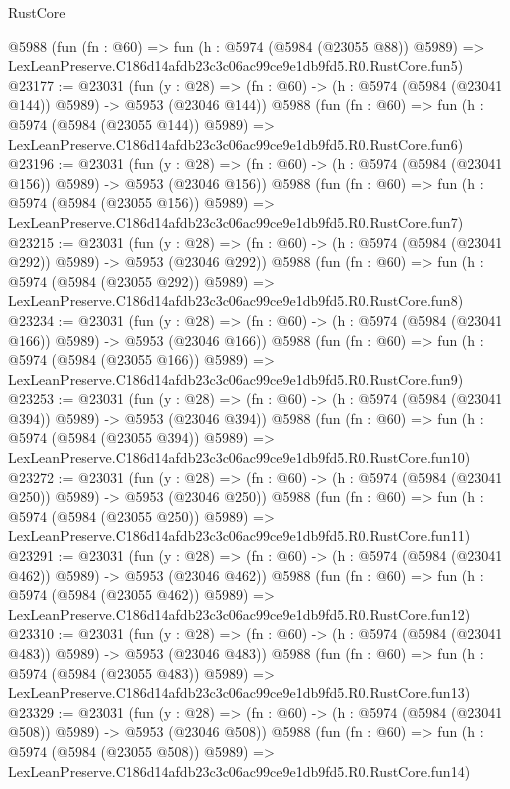 \begin{lexlean}{RustCore}
\begin{coremodule}
    @5988
    (fun (fn : @60) =>
    fun (h : @5974 (@5984 (@23055 @88)) @5989) =>
    LexLeanPreserve.C186d14afdb23c3c06ac99ce9e1db9fd5.R0.RustCore.fun5)
@23177 := @23031
    (fun (y : @28) => (fn : @60) -> (h : @5974 (@5984 (@23041 @144)) @5989) -> @5953 (@23046 @144))
    @5988
    (fun (fn : @60) =>
    fun (h : @5974 (@5984 (@23055 @144)) @5989) =>
    LexLeanPreserve.C186d14afdb23c3c06ac99ce9e1db9fd5.R0.RustCore.fun6)
@23196 := @23031
    (fun (y : @28) => (fn : @60) -> (h : @5974 (@5984 (@23041 @156)) @5989) -> @5953 (@23046 @156))
    @5988
    (fun (fn : @60) =>
    fun (h : @5974 (@5984 (@23055 @156)) @5989) =>
    LexLeanPreserve.C186d14afdb23c3c06ac99ce9e1db9fd5.R0.RustCore.fun7)
@23215 := @23031
    (fun (y : @28) => (fn : @60) -> (h : @5974 (@5984 (@23041 @292)) @5989) -> @5953 (@23046 @292))
    @5988
    (fun (fn : @60) =>
    fun (h : @5974 (@5984 (@23055 @292)) @5989) =>
    LexLeanPreserve.C186d14afdb23c3c06ac99ce9e1db9fd5.R0.RustCore.fun8)
@23234 := @23031
    (fun (y : @28) => (fn : @60) -> (h : @5974 (@5984 (@23041 @166)) @5989) -> @5953 (@23046 @166))
    @5988
    (fun (fn : @60) =>
    fun (h : @5974 (@5984 (@23055 @166)) @5989) =>
    LexLeanPreserve.C186d14afdb23c3c06ac99ce9e1db9fd5.R0.RustCore.fun9)
@23253 := @23031
    (fun (y : @28) => (fn : @60) -> (h : @5974 (@5984 (@23041 @394)) @5989) -> @5953 (@23046 @394))
    @5988
    (fun (fn : @60) =>
    fun (h : @5974 (@5984 (@23055 @394)) @5989) =>
    LexLeanPreserve.C186d14afdb23c3c06ac99ce9e1db9fd5.R0.RustCore.fun10)
@23272 := @23031
    (fun (y : @28) => (fn : @60) -> (h : @5974 (@5984 (@23041 @250)) @5989) -> @5953 (@23046 @250))
    @5988
    (fun (fn : @60) =>
    fun (h : @5974 (@5984 (@23055 @250)) @5989) =>
    LexLeanPreserve.C186d14afdb23c3c06ac99ce9e1db9fd5.R0.RustCore.fun11)
@23291 := @23031
    (fun (y : @28) => (fn : @60) -> (h : @5974 (@5984 (@23041 @462)) @5989) -> @5953 (@23046 @462))
    @5988
    (fun (fn : @60) =>
    fun (h : @5974 (@5984 (@23055 @462)) @5989) =>
    LexLeanPreserve.C186d14afdb23c3c06ac99ce9e1db9fd5.R0.RustCore.fun12)
@23310 := @23031
    (fun (y : @28) => (fn : @60) -> (h : @5974 (@5984 (@23041 @483)) @5989) -> @5953 (@23046 @483))
    @5988
    (fun (fn : @60) =>
    fun (h : @5974 (@5984 (@23055 @483)) @5989) =>
    LexLeanPreserve.C186d14afdb23c3c06ac99ce9e1db9fd5.R0.RustCore.fun13)
@23329 := @23031
    (fun (y : @28) => (fn : @60) -> (h : @5974 (@5984 (@23041 @508)) @5989) -> @5953 (@23046 @508))
    @5988
    (fun (fn : @60) =>
    fun (h : @5974 (@5984 (@23055 @508)) @5989) =>
    LexLeanPreserve.C186d14afdb23c3c06ac99ce9e1db9fd5.R0.RustCore.fun14)

\end{coremodule}
\end{lexlean}
